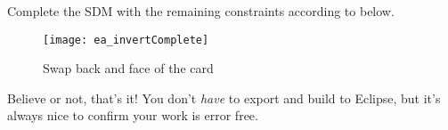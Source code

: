 \begin{stepbystep}
\item Complete the SDM with the remaining constraints according to  below.

\vspace{0.5cm}

\begin{figure}[htbp]
\begin{center}
  \texttt{[image: ea\_invertComplete]}
  \caption{Swap back and face of the card}  
  \label{ea:sdm_invertComplete}
\end{center}
\end{figure}

\vspace{0.5cm}

\item Believe or not, that's it! You don't \emph{have} to export and build to Eclipse, but it's always nice to confirm your work is error
free.

\end{stepbystep}
